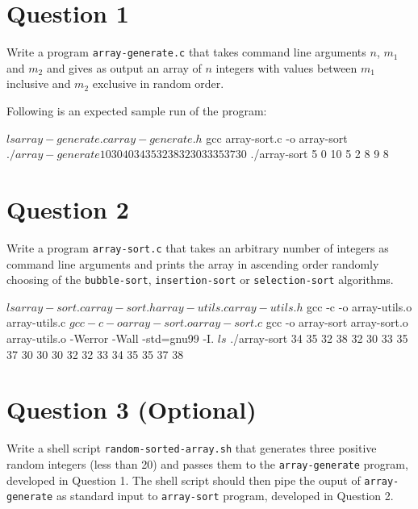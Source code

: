 \documentclass[12pt,letterpaper,twoside]{article}
\begin{document}


\section*{Question 1}

Write a program \texttt{array-generate.c} that takes command line arguments $n$, $m_1$ and $m_2$ and gives as output an array of $n$ integers with values between $m_1$ inclusive and $m_2$ exclusive in random order.

Following is an expected sample run of the program:

\begin{terminal}
$ ls
array-generate.c array-generate.h
$ gcc array-sort.c -o array-sort
$ ./array-generate 10 30 40
34 35 32 38 32 30 33 35 37 30
$ ./array-sort 5 0 10
5 2 8 9 8
\end{terminal}

\section*{Question 2}

Write a program \texttt{array-sort.c} that takes an arbitrary number of integers as command line arguments and prints the array in ascending order randomly choosing of the \texttt{bubble-sort}, \texttt{insertion-sort} or \texttt{selection-sort} algorithms.

\begin{terminal}
$ ls
array-sort.c array-sort.h array-utils.c array-utils.h
$ gcc -c -o array-utils.o array-utils.c 
$ gcc -c -o array-sort.o array-sort.c 
$ gcc -o array-sort array-sort.o array-utils.o -Werror -Wall -std=gnu99 -I.
$ ls
$ ./array-sort 34 35 32 38 32 30 33 35 37 30
30 30 32 32 33 34 35 35 37 38
\end{terminal}

\section*{Question 3 (Optional)}

Write a shell script \texttt{random-sorted-array.sh} that generates three positive random integers (less than 20) and passes them to the \texttt{array-generate} program, developed in Question 1.
The shell script should then pipe the ouput of \texttt{array-generate} as standard input to \texttt{array-sort} program, developed in Question 2.
\end{document}
